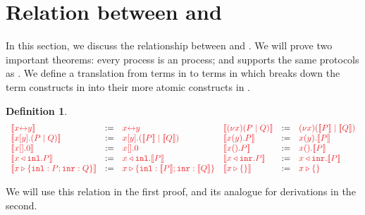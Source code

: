 \documentclass[submission,copyright,creativecommons]{eptcs}
\newtheorem{definition}[lemma]{Definition}
\begin{document}
\section{Relation between \cp and \hcp}
\label{sec:cp2hcp}

In this section, we discuss the relationship between \cp and \hcp. We will prove two important theorems: every \cp process is an \hcp process; and \hcp supports the same protocols as \cp. We define a translation from terms in \cp to terms in \hcp which breaks down the term constructs in \cp into their more atomic constructs in \hcp.
\begin{definition}\label{def:cp2hcp-terms}
  \[
    \begin{array}{lcllcl}
         \tm{\mtf{\cpLink{x}{y}}}
      &  := & \tm{\cpLink{x}{y}}
      &  \tm{\mtf{\cpCut{x}{P}{Q}}}
      &  := & \tm{\piNew{x}{(\piPar{\mtf{P}}{\mtf{Q}})}}
      \\ \tm{\mtf{\cpSend{x}{y}{P}{Q}}}
      &  := & \tm{\piBoundSend{x}{y}{(\piPar{\mtf{P}}{\mtf{Q}})}}
      &  \tm{\mtf{\cpRecv{x}{y}{P}}}
      &  := & \tm{\piRecv{x}{y}{\mtf{P}}}
      \\ \tm{\mtf{\cpHalt{x}}}
      &  := & \tm{\piBoundSend{x}{}{\piHalt}}
      &  \tm{\mtf{\cpWait{x}{P}}}
      &  := & \tm{\piRecv{x}{}{\mtf{P}}}
      \\ \tm{\mtf{\cpInl{x}{P}}}
      &  := & \tm{\cpInl{x}{\mtf{P}}}
      &  \tm{\mtf{\cpInr{x}{P}}}
      &  := & \tm{\cpInr{x}{\mtf{P}}}
      \\ \tm{\mtf{\cpCase{x}{P}{Q}}}
      &  := & \tm{\cpCase{x}{\mtf{P}}{\mtf{Q}}}
      &  \tm{\mtf{\cpAbsurd{x}}}
      &  := & \tm{\cpAbsurd{x}}
    \end{array}
  \]
\end{definition}\noindent
We will use this relation in the first proof, and its analogue for derivations in the second.
\end{document}
